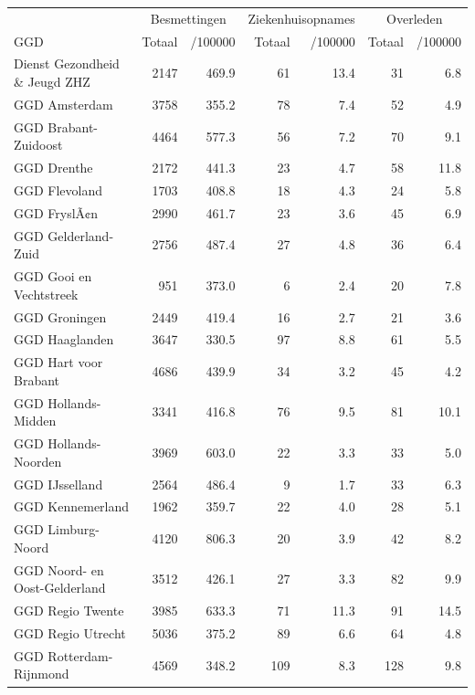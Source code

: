 \documentclass[
  english,
  man,floatsintext]{apa6}
\begin{document}
\begin{table}[H]
\centering\begingroup\fontsize{10}{12}\selectfont

\begin{threeparttable}
\begin{tabular}{lrrrrrr}
\toprule
\multicolumn{1}{c}{ } & \multicolumn{2}{c}{Besmettingen} & \multicolumn{2}{c}{Ziekenhuisopnames} & \multicolumn{2}{c}{Overleden} \\
\cmidrule(l{3pt}r{3pt}){2-3} \cmidrule(l{3pt}r{3pt}){4-5} \cmidrule(l{3pt}r{3pt}){6-7}
GGD & Totaal & /100000 & Totaal & /100000 & Totaal & /100000\\
\midrule
Dienst Gezondheid \& Jeugd ZHZ & 2147 & 469.9 & 61 & 13.4 & 31 & 6.8\\
GGD Amsterdam & 3758 & 355.2 & 78 & 7.4 & 52 & 4.9\\
GGD Brabant-Zuidoost & 4464 & 577.3 & 56 & 7.2 & 70 & 9.1\\
GGD Drenthe & 2172 & 441.3 & 23 & 4.7 & 58 & 11.8\\
GGD Flevoland & 1703 & 408.8 & 18 & 4.3 & 24 & 5.8\\
GGD FryslÃ¢n & 2990 & 461.7 & 23 & 3.6 & 45 & 6.9\\
GGD Gelderland-Zuid & 2756 & 487.4 & 27 & 4.8 & 36 & 6.4\\
GGD Gooi en Vechtstreek & 951 & 373.0 & 6 & 2.4 & 20 & 7.8\\
GGD Groningen & 2449 & 419.4 & 16 & 2.7 & 21 & 3.6\\
GGD Haaglanden & 3647 & 330.5 & 97 & 8.8 & 61 & 5.5\\
GGD Hart voor Brabant & 4686 & 439.9 & 34 & 3.2 & 45 & 4.2\\
GGD Hollands-Midden & 3341 & 416.8 & 76 & 9.5 & 81 & 10.1\\
GGD Hollands-Noorden & 3969 & 603.0 & 22 & 3.3 & 33 & 5.0\\
GGD IJsselland & 2564 & 486.4 & 9 & 1.7 & 33 & 6.3\\
GGD Kennemerland & 1962 & 359.7 & 22 & 4.0 & 28 & 5.1\\
GGD Limburg-Noord & 4120 & 806.3 & 20 & 3.9 & 42 & 8.2\\
GGD Noord- en Oost-Gelderland & 3512 & 426.1 & 27 & 3.3 & 82 & 9.9\\
GGD Regio Twente & 3985 & 633.3 & 71 & 11.3 & 91 & 14.5\\
GGD Regio Utrecht & 5036 & 375.2 & 89 & 6.6 & 64 & 4.8\\
GGD Rotterdam-Rijnmond & 4569 & 348.2 & 109 & 8.3 & 128 & 9.8\\

\end{tabular}
\end{threeparttable}
\end{table}
\end{document}
